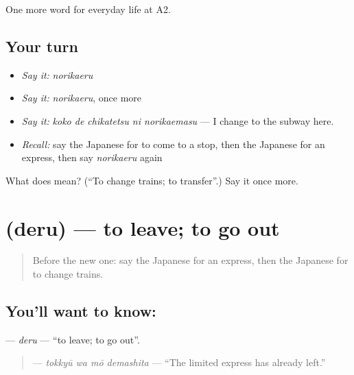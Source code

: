 \begin{grammarlens}[title={What you've built}]
One more word for everyday life at A2.
\end{grammarlens}

\subsection*{Your turn}
\begin{itemize}
\raggedright
  \item \emph{Say it:} \emph{norikaeru}
  \item \emph{Say it:} \emph{norikaeru}, once more
  \item \emph{Say it:} \emph{koko de chikatetsu ni norikaemasu} — I change to the subway here.
  \item \emph{Recall:} say the Japanese for to come to a stop, then the Japanese for an express, then say \emph{norikaeru} again
\end{itemize}

\begin{tcolorbox}[breakable,colback=teal!4,colframe=teal!35!black,title={Before you move on}]
What does  mean? (\textquotedblleft{}To change trains; to transfer\textquotedblright{}.) Say it once more.
\end{tcolorbox}
\section[\texorpdfstring{\ja{でる} (deru)}{でる (deru)}]{ (deru) — to leave; to go out}

\label{lesson:JA-C200-deru}



\begin{quote}
Before the new one: say the Japanese for an express, then the Japanese for to change trains.
\end{quote}

\subsection*{You'll want to know: }
\textbf{} — \emph{deru} — \textquotedblleft{}to leave; to go out\textquotedblright{}.

\begin{quote}
\textbf{  } — \emph{tokkyū wa mō demashita} — \textquotedblleft{}The limited express has already left.\textquotedblright{}
\end{quote}

